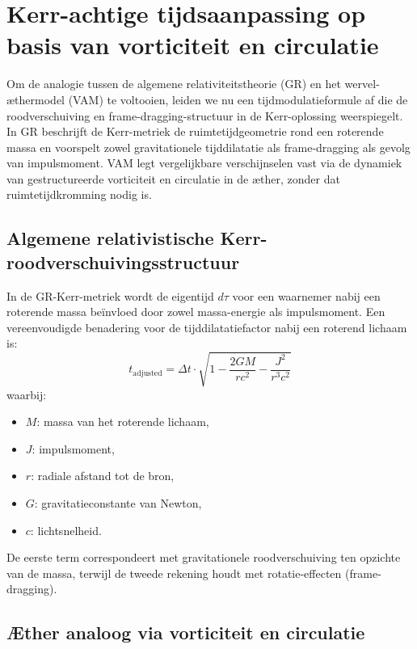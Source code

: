 \section{Kerr-achtige tijdsaanpassing op basis van vorticiteit en circulatie}

Om de analogie tussen de algemene relativiteitstheorie (GR) en het wervel-æthermodel (VAM) te voltooien, leiden we nu een tijdmodulatieformule af die de roodverschuiving en frame-dragging-structuur in de Kerr-oplossing weerspiegelt. In GR beschrijft de Kerr-metriek de ruimtetijdgeometrie rond een roterende massa en voorspelt zowel gravitationele tijddilatatie als frame-dragging als gevolg van impulsmoment. VAM legt vergelijkbare verschijnselen vast via de dynamiek van gestructureerde vorticiteit en circulatie in de æther, zonder dat ruimtetijdkromming nodig is.

\subsection{Algemene relativistische Kerr-roodverschuivingsstructuur}

In de GR-Kerr-metriek wordt de eigentijd $d\tau$ voor een waarnemer nabij een roterende massa beïnvloed door zowel massa-energie als impulsmoment. Een vereenvoudigde benadering voor de tijddilatatiefactor nabij een roterend lichaam is:
\begin{equation}
t_\text{adjusted} = \Delta t \cdot \sqrt{1 - \frac{2GM}{rc^2} - \frac{J^2}{r^3c^2}}
\label{eq:Kerr_time_dilation}
\end{equation}
waarbij:
\begin{itemize}
\item $M$: massa van het roterende lichaam,
\item $J$: impulsmoment,
\item $r$: radiale afstand tot de bron,
\item $G$: gravitatieconstante van Newton,
\item $c$: lichtsnelheid.
\end{itemize}

De eerste term correspondeert met gravitationele roodverschuiving ten opzichte van de massa, terwijl de tweede rekening houdt met rotatie-effecten (frame-dragging).

\subsection{Æther analoog via vorticiteit en circulatie}

